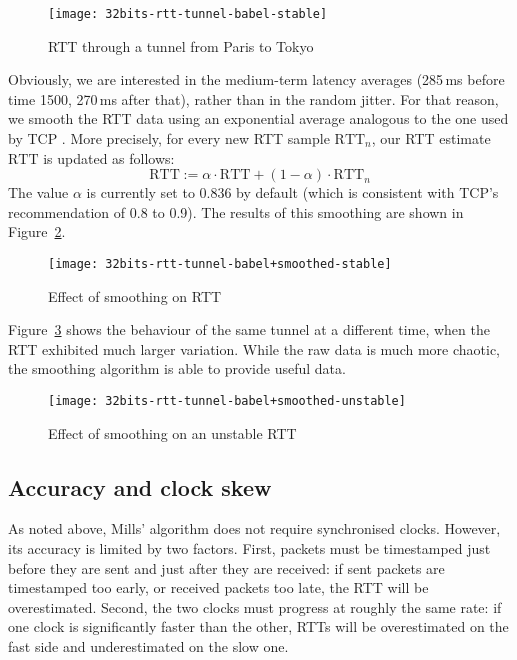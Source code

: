 \documentclass[conference,letterpaper]{IEEEtran}
\begin{document}
\begin{figure}[htb]
\centering
\texttt{[image: 32bits-rtt-tunnel-babel-stable]}
\caption{RTT through a tunnel from Paris to
  Tokyo}\label{fig:rtt-paris-tokyo}
\end{figure}

Obviously, we are interested in the medium-term latency averages
(285\,ms before time 1500, 270\,ms after that), rather than in the
random jitter.  For that reason, we smooth the RTT data using an
exponential average analogous to the one used by TCP \cite{rfc793}.
More precisely, for every new RTT sample $\mathrm{RTT}_n$, our RTT
estimate $\mathrm{RTT}$ is updated as follows:
\[ \mathrm{RTT} := \alpha\cdot\mathrm{RTT} + (1 - \alpha)\cdot\mathrm{RTT}_n \]
The value $\alpha$ is currently set to 0.836 by default (which is
consistent with TCP's recommendation of 0.8 to 0.9).  The results of
this smoothing are shown in Figure~\ref{fig:rtt-paris-tokyo-smoothed}.

\begin{figure}[htb]
\centering
\texttt{[image: 32bits-rtt-tunnel-babel+smoothed-stable]}
\caption{Effect of smoothing on RTT}\label{fig:rtt-paris-tokyo-smoothed}
\end{figure}

Figure~\ref{fig:rtt-paris-tokyo-unstable} shows the behaviour of the
same tunnel at a different time, when the RTT exhibited much larger
variation.  While the raw data is much more chaotic, the smoothing
algorithm is able to provide useful data.

\begin{figure}[htb]
\centering
\texttt{[image: 32bits-rtt-tunnel-babel+smoothed-unstable]}
\caption{Effect of smoothing on an unstable RTT}\label{fig:rtt-paris-tokyo-unstable}
\end{figure}

\subsection{Accuracy and clock skew}

As noted above, Mills' algorithm does not require synchronised clocks.
However, its accuracy is limited by two factors.  First, packets must
be timestamped just before they are sent and just after they are
received: if sent packets are timestamped too early, or received
packets too late, the RTT will be overestimated.  Second, the two
clocks must progress at roughly the same rate: if one clock is
significantly faster than the other, RTTs will be overestimated on the
fast side and underestimated on the slow one.
\end{document}
